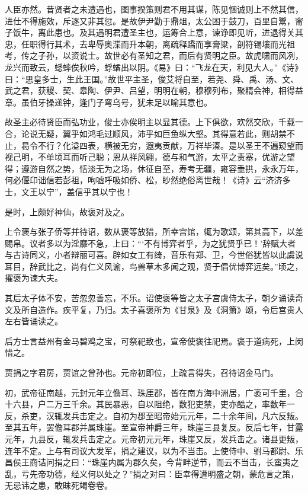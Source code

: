 \documentclass[12pt,UTF8]{ctexbook}
\begin{document}
人臣亦然。昔贤者之未遭遇也，图事揆策则君不用其谋，陈见悃诚则上不然其信，进仕不得施效，斥逐又非其愆。是故伊尹勤于鼎俎，太公困于鼓刀，百里自鬻，甯子饭牛，离此患也。及其遇明君遭圣主也，运筹合上意，谏诤即见听，进退得关其忠，任职得行其术，去卑辱奥渫而升本朝，离疏释蹻而享膏粱，剖符锡壤而光祖考，传之子孙，以资说士。故世必有圣知之君，而后有贤明之臣。故虎啸而风冽，龙兴而致云，蟋蟀俟秋吟，蜉蝤出以阴。《易》曰：“飞龙在天，利见大人。”《诗》曰：“思皇多士，生此王国。”故世平主圣，俊艾将自至，若尧、舜、禹、汤、文、武之君，获稷、契、皋陶、伊尹、吕望，明明在朝，穆穆列布，聚精会神，相得益章。虽伯牙操递钟，逢门子弯乌号，犹未足以喻其意也。



故圣主必待贤臣而弘功业，俊士亦俟明主以显其德。上下俱欲，欢然交欣，千载一合，论说无疑，翼乎如鸿毛过顺风，沛乎如巨鱼纵大壑。其得意若此，则胡禁不止，曷令不行？化溢四表，横被无穷，遐夷贡献，万祥毕溱。是以圣王不遍窥望而视己明，不单顷耳而听己聪；恩从祥风翱，德与和气游，太平之责塞，优游之望得；遵游自然之势，恬淡无为之场，休征自至，寿考无疆，雍容垂拱，永永万年，何必偃卬诎信若彭祖，呴嘘呼吸如侨、松，眇然绝俗离世哉！《诗》云“济济多士，文王以宁”，盖信乎其以宁也！



是时，上颇好神仙，故褒对及之。



上令褒与张子侨等并待诏，数从褒等放猎，所幸宫馆，辄为歌颂，第其高下，以差赐帛。议者多以为淫靡不急，上曰：“‘不有博弈者乎，为之犹贤乎已！’辞赋大者与古诗同义，小者辩丽可喜。辟如女工有绮，音乐有郑、卫，今世俗犹皆以此虞说耳目，辞武比之，尚有仁义风谕，鸟兽草木多闻之观，贤于倡优博弈远矣。”顷之，擢褒为谏大夫。



其后太子体不安，苦忽忽善忘，不乐。诏使褒等皆之太子宫虞侍太子，朝夕诵读奇文及所自造作。疾平复，乃归。太子喜褒所为《甘泉》及《洞箫》颂，令后宫贵人左右皆诵读之。



后方士言益州有金马碧鸡之宝，可祭祀致也，宣帝使褒往祀焉。褒于道病死，上闵惜之。



贾捐之字君房，贾谊之曾孙也。元帝初即位，上疏言得失，召待诏金马门。



初，武帝征南越，元封元年立儋耳、珠厓郡，皆在南方海中洲居，广袤可千里，合十六县，户二万三千余。其民暴恶，自以阻绝，数犯吏禁，吏亦酷之，率数年一反，杀吏，汉辄发兵击定之。自初为郡至昭帝始元元年，二十余年间，凡六反叛。至其五年，罢儋耳郡并属珠崖。至宣帝神爵三年，珠崖三县复反。反后七年，甘露元年，九县反，辄发兵击定之。元帝初元元年，珠崖又反，发兵击之。诸县更叛，连年不定。上与有司议大发军，捐之建议，以为不当击。上使侍中、驸马都尉、乐昌侯王商诘问捐之曰：“珠崖内属为郡久矣，今背畔逆节，而云不当击，长蛮夷之乱，亏先帝功德，经义何以处之？”捐之对曰：臣幸得遭明盛之朝，蒙危言之策，无忌讳之患，敢昧死竭卷卷。
\end{document}
